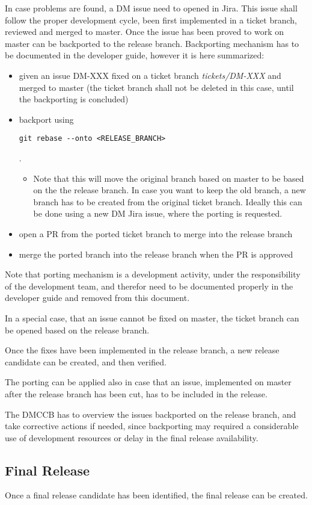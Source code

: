 In case problems are found, a DM issue need to opened in Jira.
This issue shall follow the proper development cycle, been first implemented in a ticket branch, reviewed and merged to master.
Once the issue has been proved to work on master can be backported to the release branch. Backporting mechanism has to be documented in the developer guide, however it is here summarized:

\begin{itemize}
\item given an issue DM-XXX fixed on a ticket branch \textit{tickets/DM-XXX} and merged to master (the ticket branch shall not be deleted in this case, until the backporting is concluded)
\item backport using \begin{verbatim}git rebase --onto <RELEASE_BRANCH>\end{verbatim} . 
\begin{itemize}
\item Note that this will move the original branch based on master to be based on the the release branch. In case you want to keep the old branch, a new branch has to be created from the original ticket branch. Ideally this can be done using a new DM Jira issue, where the porting is requested.
\end{itemize}
\item open a PR from the ported ticket branch to merge into the release branch
\item merge the ported branch into the release branch when the PR is approved
\end{itemize}

Note that porting mechanism is a development activity, under the responsibility of the development team, and therefor need to be documented properly in the developer guide and removed from this document.

In a special case, that an issue cannot be fixed on master, the ticket branch can be opened based on the release branch.

Once the fixes have been implemented in the release branch, a new release candidate can be created, and then verified.

The porting can be applied also in case that an issue, implemented on master after the release branch has been cut, has to be included in the release.

The DMCCB has to overview the issues backported on the release branch, and take corrective actions if needed, since backporting may required a considerable use of development resources or delay in the final release availability.

\subsection{Final Release} \label{sect:finalrelease}

Once a final release candidate has been identified, the final release can be created.